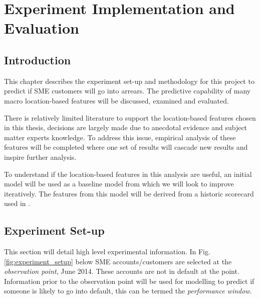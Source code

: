 
\chapter{Experiment Implementation and Evaluation} %

\label{Chapter4} %


\section{Introduction}
This chapter describes the experiment set-up and methodology for this project to predict if SME customers will go into arrears. The predictive capability of many macro location-based features will be discussed, examined and evaluated.

There is relatively limited literature to support the location-based features chosen in this thesis, decisions are largely made due to anecdotal evidence and subject matter experts knowledge. To address this issue, empirical analysis of these features will be completed where one set of results will cascade new results and inspire further analysis. 

To understand if the location-based features in this analysis are useful, an initial model will be used as a baseline model from which we will look to improve iteratively. The features from this model will be derived from a historic scorecard used in \subjectname.  

\section{Experiment Set-up}
This section will detail high level experimental information. In Fig. \ref{fig:experiment_setup} below SME accounts/customers are selected at the \textit{observation point}, June 2014. These accounts are not in default at the point. Information prior to the observation point will be used for modelling to predict if someone is likely to go into default, this can be termed the \textit{performance window}.

